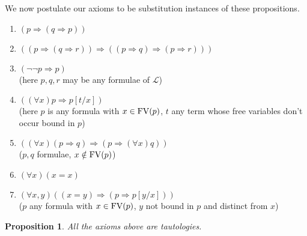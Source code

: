 \documentclass{report}
\theoremstyle{definition}
\theoremstyle{plain}
\newtheorem{prop}[thm]{Proposition}
\theoremstyle{definition}
\begin{document}
	We now postulate our axioms to be substitution instances of these propositions.
	\begin{enumerate}
		\item $(p\Rightarrow (q\Rightarrow p))$
		\item $((p\Rightarrow (q\Rightarrow r)) \Rightarrow ((p \Rightarrow q) \Rightarrow (p\Rightarrow r)))$
		\item $(\neg\neg p \Rightarrow p)$\\ (here $p,q,r$ may be any formulae of $\mathcal{L}$)
		\item $((\forall x)p \Rightarrow p[t/x])$\\ (here $p$ is any formula with $x\in \textnormal{FV}(p)$, $t$ any term whose free variables don't occur bound in $p$)
		\item $((\forall x) (p\Rightarrow q) \Rightarrow (p \Rightarrow (\forall x)q))$\\ ($p,q$ formulae, $x\notin \textnormal{FV}(p)$)
		\item $(\forall x)(x = x)$
		\item $(\forall x,y)((x = y) \Rightarrow (p \Rightarrow p[y/x]))$\\ ($p$ any formula with $x\in \textnormal{FV}(p)$, $y$ not bound in $p$ and distinct from $x$)
	\end{enumerate}
	\begin{prop}
		All the axioms above are tautologies.
	\end{prop}
\end{document}
